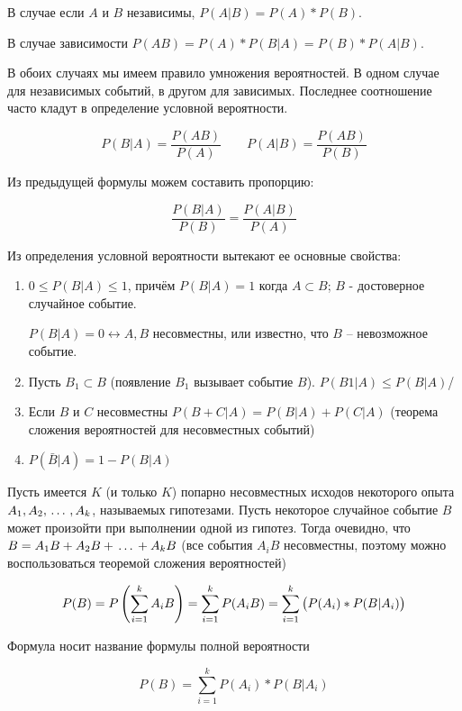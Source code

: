 ﻿\documentclass[a4paper,12pt]{report}
\begin{document}
	В случае если $A$ и $B$ независимы, $P(A|B) = P(A)*P(B)$. 

	В случае зависимости $P(AB) = P(A)*P(B|A) = P(B)*P(A|B)$. 

	В обоих случаях мы имеем правило умножения вероятностей. В одном случае для независимых событий, в другом для зависимых. Последнее соотношение часто кладут в определение условной вероятности. 

	$$
	  P(B|A) = \frac{P(AB)}{P(A)} \qquad 
	  P(A|B) = \frac{P(AB)}{P(B)}
	$$

	Из предыдущей формулы можем составить пропорцию: 
	
	$$
	  \frac{P(B|A)}{P(B)} = \frac{P(A|B)}{P(A)}
	$$

	Из определения условной вероятности вытекают ее основные свойства:


	\begin{enumerate}

	\item	$0 \leqslant P(B|A) \leqslant 1$, причём $P(B|A) = 1$ когда $A \subset B$; $B$ - достоверное случайное событие.

		$P(B|A) = 0 \longleftrightarrow A, B$ несовместны, или известно, что $B$ – невозможное событие.

	
	\item	Пусть $B_1 \subset B$ (появление $B_1$ вызывает событие $B$). \; $P(B1|A) \leqslant P(B|A)$/


	\item	Если $B$ и $C$ несовместны $P(B+C|A) = P(B|A) + P(C|A)$ (теорема сложения вероятностей для несовместных событий)


	\item	$P(\bar B|A) =  1 - P(B|A)$

	\end{enumerate}


	 Пусть имеется $K$ (и только $K$) попарно несовместных исходов некоторого опыта $A_1,A_2, \,\ldots\, ,A_k$, называемых гипотезами. Пусть некоторое случайное событие $B$ может произойти при выполнении одной из гипотез. Тогда очевидно, что $B = A_1B + A_2B + \,\ldots\, + A_kB$ (все события $A_iB$ несовместны, поэтому можно воспользоваться теоремой сложения вероятностей)

	$$
	  P(B) = P\left(\sum^k_{i=1}A_iB\right)
	       = \sum^k_{i=1}P(A_iB) 
	       = \sum^k_{i=1}\left(P(A_i)*P(B|A_i)\strut\right)
	$$

	Формула носит название формулы полной вероятности 

	$$
	  P(B) = \sum^k_{i=1}P(A_i)*P(B|A_i)
	$$
\end{document}
